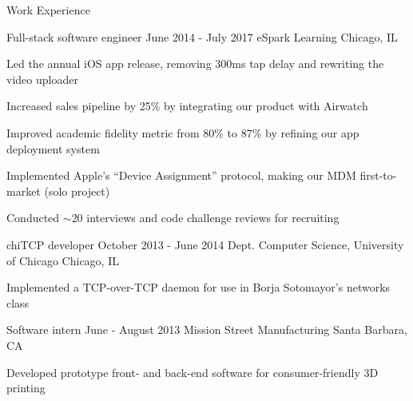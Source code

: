 \documentclass{resume} %
\begin{document}
\begin{rSection}{Work Experience}

\begin{rSubsection}{Full-stack software engineer}{ June 2014 - July 2017}{ eSpark Learning}{ Chicago, IL}
\item Led the annual iOS app release, removing 300ms tap delay and rewriting the video uploader
\item Increased sales pipeline by 25\% by integrating our product with Airwatch
\item Improved academic fidelity metric from 80\% to 87\% by refining our app deployment system
\item Implemented Apple's ``Device Assignment'' protocol, making our MDM first-to-market (solo project)
\item Conducted $\sim$20 interviews and code challenge reviews for recruiting
\end{rSubsection}

\begin{rSubsection}{ chiTCP developer}{ October 2013 - June 2014}{ Dept. Computer Science, University of Chicago}{ Chicago, IL}
\item Implemented a TCP-over-TCP daemon for use in Borja Sotomayor's networks class
\end{rSubsection}

\begin{rSubsection}{ Software intern}{ June - August 2013}{ Mission Street Manufacturing}{ Santa Barbara, CA}
\item Developed prototype front- and back-end software for consumer-friendly 3D printing
\end{rSubsection}

\end{rSection}
\end{document}
